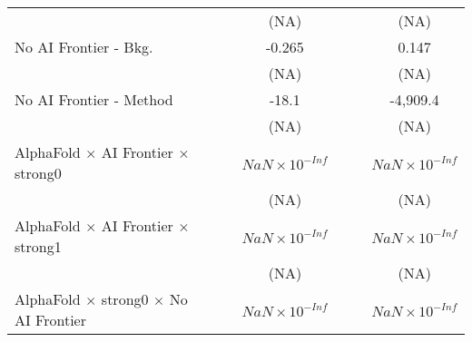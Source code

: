 \begin{tabular}{lcccccc}
                                                                              &                        &                        & (NA)                   &                        &                        & (NA)\\   
   No AI Frontier - Bkg.                                                      &                        &                        & -0.265                 &                        &                        & 0.147\\   
                                                                              &                        &                        & (NA)                   &                        &                        & (NA)\\   
   No AI Frontier - Method                                                    &                        &                        & -18.1                  &                        &                        & -4,909.4\\   
                                                                              &                        &                        & (NA)                   &                        &                        & (NA)\\   
   AlphaFold $\times$ AI Frontier $\times$ strong0                            &                        &                        & $NaN\times 10^{-Inf}$  &                        &                        & $NaN\times 10^{-Inf}$\\    
                                                                              &                        &                        & (NA)                   &                        &                        & (NA)\\   
   AlphaFold $\times$ AI Frontier $\times$ strong1                            &                        &                        & $NaN\times 10^{-Inf}$  &                        &                        & $NaN\times 10^{-Inf}$\\    
                                                                              &                        &                        & (NA)                   &                        &                        & (NA)\\   
   AlphaFold $\times$ strong0 $\times$ No AI Frontier                         &                        &                        & $NaN\times 10^{-Inf}$  &                        &                        & $NaN\times 10^{-Inf}$\\    

\end{tabular}
